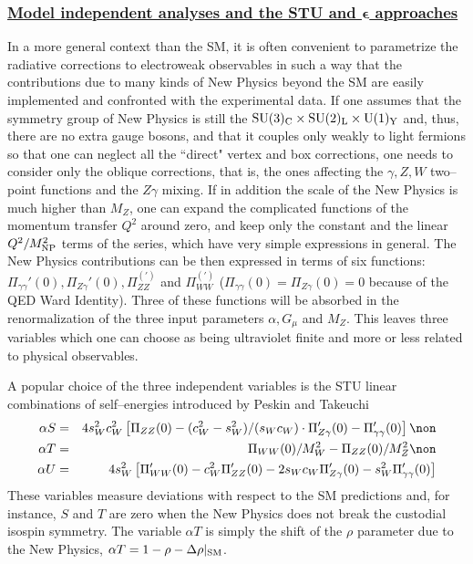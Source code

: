 \subsubsection*{\underline{Model independent analyses and the STU and 
$\mathbf{\epsilon}$ approaches}}

In a more general context than the SM, it is often convenient to parametrize 
the radiative corrections to electroweak observables
in such a way that the contributions due to many kinds of New Physics beyond 
the SM are easily implemented and confronted with the experimental data. 
If one assumes that the symmetry group of New Physics is still the 
${\rm SU(3)_C \times SU(2)_L \times U(1)_Y}$ and, thus, there are no extra 
gauge bosons, and that it couples only weakly to light fermions so that one 
can neglect all the ``direct" vertex and box corrections, one needs to 
consider only the oblique corrections, that is, the ones affecting the $\gamma, 
Z,W$ two--point functions and the $Z\gamma$ mixing. If in addition the scale 
of the New Physics is much higher than $M_Z$, one can expand the complicated 
functions of the momentum transfer $Q^2$ around zero, and keep only the 
constant and the linear $Q^2/M_{\rm NP}^2$ terms of the series, which have
very simple expressions in general. The New Physics contributions can be then
expressed in terms of six functions: $\Pi_{\gamma\gamma}'(0), \Pi_{Z\gamma}'(0),\Pi_{ZZ}^{(')}$ and $\Pi_{WW}^{(')}$ ($\Pi_{\gamma \gamma}(0) = \Pi_{Z\gamma}
(0) =0$ because of the QED Ward Identity). Three of these functions will be 
absorbed in the renormalization of the three input parameters $\alpha, G_\mu$ 
and $M_Z$. This leaves three variables which one can choose as being 
ultraviolet finite and more or less related to physical observables.\s

A popular choice of the three independent variables is the STU linear 
combinations of self--energies introduced by Peskin and Takeuchi 
\cite{STU-approach}  
\begin{eqnarray} 
\alpha S &=& 4 s_W^2 c_W^2 \left[ \Pi_{ZZ}(0) - (c_W^2 - s_W^2)/(s_W c_W)
\cdot  \Pi'_{Z\gamma}(0) -\Pi'_{\gamma \gamma}(0) \right] \non \\
\alpha T &=& \Pi_{WW}(0)/M_W^2 - \Pi_{ZZ}(0)/M_Z^2 \non \\
\alpha U &=& 4 s_W^2  \left[ \Pi'_{WW}(0) - c_W^2 \Pi'_{ZZ}(0)
- 2 s_W c_W \Pi'_{Z\gamma}(0) - s_W^2 \Pi'_{\gamma \gamma}(0) \right] 
\end{eqnarray} 
These variables measure deviations with respect to the SM predictions and, for
instance, $S$ and $T$ are zero when the New Physics does not break the
custodial isospin symmetry. The variable $\alpha T$ is simply the shift of the
$\rho$ parameter due to the New Physics, $\alpha T = 1-\rho - \Delta
\rho|_{\rm SM}$.\s

